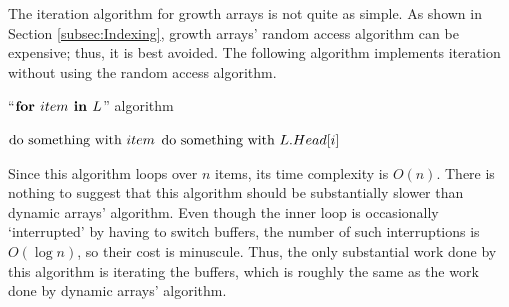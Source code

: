 \HdrGrowthArrayImpl

The iteration algorithm for growth arrays is not quite as simple. As shown in Section \ref{subsec:Indexing}, growth arrays' random access algorithm can be expensive; thus, it is best avoided. The following algorithm implements iteration without using the random access algorithm.

\begin{algorithm}[H]
	\caption{``$\textbf{for } item \textbf{ in } L$'' algorithm \TextGrowthArray}
	\begin{algorithmic}
			\For{$\LclItem \TextIn \LclBuffer$}
				\State $\text{do something with } item$
			\EndFor
		\EndFor
			\State $\text{do something with } L.Head[i]$
		\EndFor
	\end{algorithmic}
\end{algorithm}

Since this algorithm loops over $n$ items, its time complexity is $O(n)$. There is nothing to suggest that this algorithm should be substantially slower than dynamic arrays' algorithm. Even though the inner loop is occasionally `interrupted' by having to switch buffers, the number of such interruptions is $O(\log n)$, so their cost is minuscule. Thus, the only substantial work done by this algorithm is iterating the buffers, which is roughly the same as the work done by dynamic arrays' algorithm.
